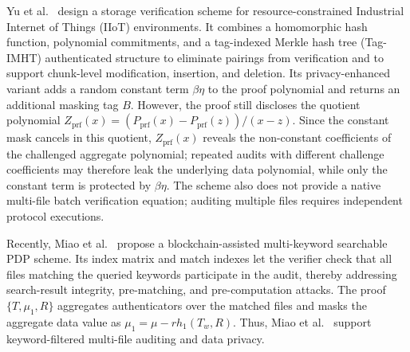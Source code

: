 \documentclass[lettersize,journal]{IEEEtran}
\begin{document}
Yu et al.~\cite{YuTC25} design a storage verification scheme for resource-constrained Industrial Internet of Things (IIoT) environments. It combines a homomorphic hash function, polynomial commitments, and a tag-indexed Merkle hash tree (Tag-IMHT) authenticated structure to eliminate pairings from verification and to support chunk-level modification, insertion, and deletion. Its privacy-enhanced variant adds a random constant term $\beta\eta$ to the proof polynomial and returns an additional masking tag $B$. However, the proof still discloses the quotient polynomial $Z_{\mathrm{prf}}(x)=(P_{\mathrm{prf}}(x)-P_{\mathrm{prf}}(z))/(x-z)$. Since the constant mask cancels in this quotient, $Z_{\mathrm{prf}}(x)$ reveals the non-constant coefficients of the challenged aggregate polynomial; repeated audits with different challenge coefficients may therefore leak the underlying data polynomial, while only the constant term is protected by $\beta\eta$. The scheme also does not provide a native multi-file batch verification equation; auditing multiple files requires independent protocol executions.

Recently, Miao et al.~\cite{MiaoSCIS2026} propose a blockchain-assisted multi-keyword searchable PDP scheme. Its index matrix and match indexes let the verifier check that all files matching the queried keywords participate in the audit, thereby addressing search-result integrity, pre-matching, and pre-computation attacks. The proof $\{T,\mu_1,R\}$ aggregates authenticators over the matched files and masks the aggregate data value as $\mu_1=\mu-rh_1(T_w,R)$. Thus, Miao et al.~\cite{MiaoSCIS2026} support keyword-filtered multi-file auditing and data privacy. 
\end{document}
